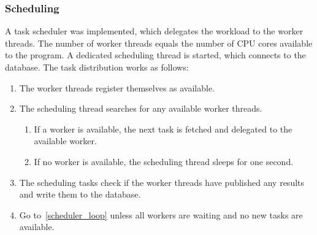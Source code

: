 	\subsubsection{Scheduling}
		A task scheduler was implemented, which delegates the workload to the worker threads. The number of worker threads equals the number of CPU cores available to the program. A dedicated scheduling thread is started, which connects to the database. The task distribution works as follows:
		\begin{enumerate}
			\item The worker threads register themselves as available.
			\item \label{scheduler_loop} The scheduling thread searches for any available worker threads.
				\begin{enumerate}
					\item If a worker is available, the next task is fetched and delegated to the available worker.
					\item If no worker is available, the scheduling thread sleeps for one second.
				\end{enumerate}
			\item The scheduling tasks check if the worker threads have published any results and write them to the database.
			\item Go to~\cref{scheduler_loop} unless all workers are waiting and no new tasks are available.
		\end{enumerate}